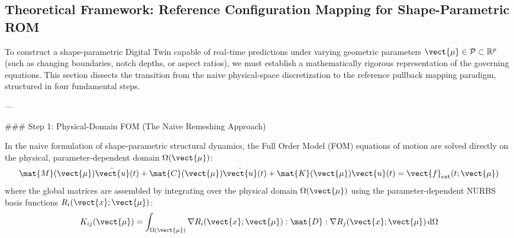 \subsection{Theoretical Framework: Reference Configuration Mapping for Shape-Parametric ROM}

To construct a shape-parametric Digital Twin capable of real-time predictions under varying geometric parameters $\vect{\mu} \in \mathcal{P} \subset \mathbb{R}^p$ (such as changing boundaries, notch depths, or aspect ratios), we must establish a mathematically rigorous representation of the governing equations. This section dissects the transition from the naive physical-space discretization to the reference pullback mapping paradigm, structured in four fundamental steps.

---

### Step 1: Physical-Domain FOM (The Naive Remeshing Approach)

In the naive formulation of shape-parametric structural dynamics, the Full Order Model (FOM) equations of motion are solved directly on the physical, parameter-dependent domain $\Omega(\vect{\mu})$:
\begin{equation}
\mat{M}(\vect{\mu})\ddot{\vect{u}}(t) + \mat{C}(\vect{\mu})\dot{\vect{u}}(t) + \mat{K}(\vect{\mu})\vect{u}(t) = \vect{f}_{\text{ext}}(t; \vect{\mu})
\end{equation}
where the global matrices are assembled by integrating over the physical domain $\Omega(\vect{\mu})$ using the parameter-dependent NURBS basis functions $R_i(\vect{x}; \vect{\mu})$:
\begin{equation}
K_{ij}(\vect{\mu}) = \int_{\Omega(\vect{\mu})} \nabla R_i(\vect{x}; \vect{\mu}) : \mat{D} : \nabla R_j(\vect{x}; \vect{\mu}) \, \mathrm{d}\Omega
\end{equation}

